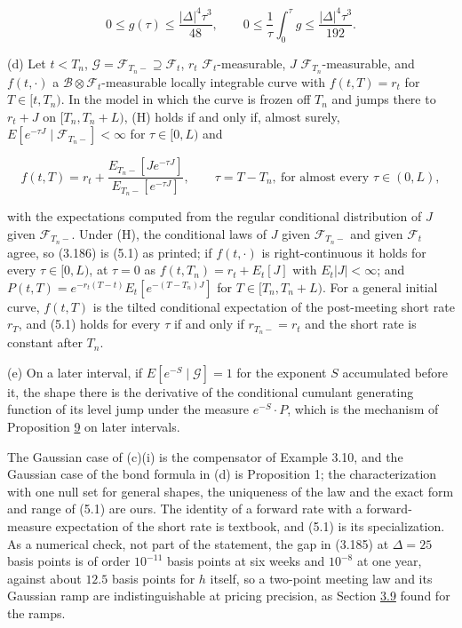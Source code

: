 \documentclass[11pt]{article}
\begin{document}
\begin{equation*}
0\le g(\tau)\le\frac{|\Delta|^4\tau^3}{48},\qquad 0\le\frac1\tau\int_0^\tau g\le\frac{|\Delta|^4\tau^3}{192}. \tag{3.185}\label{eq:3.185}
\end{equation*}

(d) Let \(t<T_n\), \(\mathcal G=\mathcal F_{T_n-}\supseteq\mathcal F_t\), \(r_t\) \(\mathcal F_t\)-measurable, \(J\) \(\mathcal F_{T_n}\)-measurable, and \(f(t,\cdot)\) a \(\mathcal B\otimes\mathcal F_t\)-measurable locally integrable curve with \(f(t,T)=r_t\) for \(T\in[t,T_n)\). In the model in which the curve is frozen off \(T_n\) and jumps there to \(r_t+J\) on \([T_n,T_n+L)\), (H) holds if and only if, almost surely, \(E[e^{-\tau J}\mid\mathcal F_{T_n-}]<\infty\) for \(\tau\in[0,L)\) and

\begin{equation*}
f(t,T)=r_t+\frac{E_{T_n-}[Je^{-\tau J}]}{E_{T_n-}[e^{-\tau J}]},\qquad\tau=T-T_n,\ \text{for almost every }\tau\in(0,L), \tag{3.186}\label{eq:3.186}
\end{equation*}

with the expectations computed from the regular conditional distribution of \(J\) given \(\mathcal F_{T_n-}\). Under (H), the conditional laws of \(J\) given \(\mathcal F_{T_n-}\) and given \(\mathcal F_t\) agree, so (3.186) is (5.1) as printed; if \(f(t,\cdot)\) is right-continuous it holds for every \(\tau\in[0,L)\), at \(\tau=0\) as \(f(t,T_n)=r_t+E_t[J]\) with \(E_t|J|<\infty\); and \(P(t,T)=e^{-r_t(T-t)}E_t[e^{-(T-T_n)J}]\) for \(T\in[T_n,T_n+L)\). For a general initial curve, \(f(t,T)\) is the tilted conditional expectation of the post-meeting short rate \(r_T\), and (5.1) holds for every \(\tau\) if and only if \(r_{T_n-}=r_t\) and the short rate is constant after \(T_n\).

(e) On a later interval, if \(E[e^{-S}\mid\mathcal G]=1\) for the exponent \(S\) accumulated before it, the shape there is the derivative of the conditional cumulant generating function of its level jump under the measure \(e^{-S}\cdot P\), which is the mechanism of Proposition \hyperref[res:Proposition-9]{9} on later intervals.

The Gaussian case of (c)(i) is the compensator of \cite{fontana2022term} Example 3.10, and the Gaussian case of the bond formula in (d) is \cite{kim2014jumps} Proposition 1; the characterization with one null set for general shapes, the uniqueness of the law and the exact form and range of (5.1) are ours. The identity of a forward rate with a forward-measure expectation of the short rate is textbook, and (5.1) is its specialization. As a numerical check, not part of the statement, the gap in (3.185) at \(\Delta=25\) basis points is of order \(10^{-11}\) basis points at six weeks and \(10^{-8}\) at one year, against about \(12.5\) basis points for \(h\) itself, so a two-point meeting law and its Gaussian ramp are indistinguishable at pricing precision, as Section \hyperref[sec:3.9]{3.9} found for the ramps.
\end{document}
